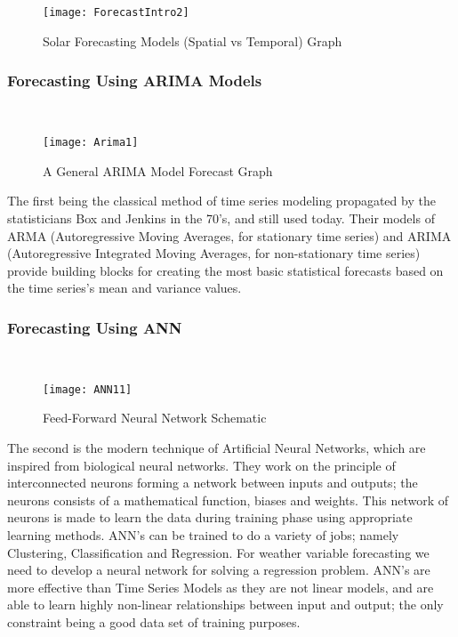 \begin{figure}[H]
\centering
\texttt{[image: ForecastIntro2]}
\caption{Solar Forecasting Models (Spatial vs Temporal) Graph }
\label{figc5h1} %
\end{figure}

\newpage

\subsubsection{Forecasting Using ARIMA Models}
\
\
\
\

\begin{figure}[H]
\centering
\texttt{[image: Arima1]}
\caption{A General ARIMA Model Forecast Graph}
\label{ari11} %
\end{figure}

The first being the classical method of time series modeling propagated by the statisticians Box and Jenkins in the 70’s, and still used today. Their models of ARMA (Autoregressive Moving Averages, for stationary time series) and ARIMA (Autoregressive Integrated Moving Averages, for non-stationary time series) provide building blocks for creating the most basic statistical forecasts based on the time series’s mean and variance values.

\newpage

\subsubsection{Forecasting Using ANN }
\
\
\
\

\begin{figure}[H]
\centering
\texttt{[image: ANN11]}
\caption{Feed-Forward Neural Network Schematic}
\label{figc6h3} %
\end{figure}

The second is the modern technique of Artificial Neural Networks, which are inspired from biological neural networks. They work on the principle of interconnected neurons forming a network between inputs and outputs; the neurons consists of a mathematical function, biases and weights. This network of neurons is made to learn the data during training phase using appropriate learning methods. ANN’s can be trained to do a variety of jobs; namely Clustering, Classification and Regression. For weather variable forecasting we need to develop a neural network for solving a regression problem. ANN’s are more effective than Time Series Models as they are not linear models, and are able to learn highly non-linear relationships between input and output; the only constraint being a good data set of training purposes.

